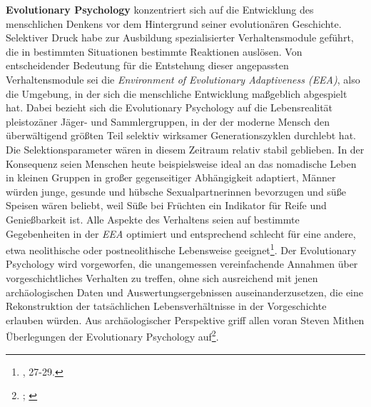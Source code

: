 \documentclass[openany,twoside,twocolumn]{book}
\let\rmarkdownfootnote\footnote%
\def\footnote{\protect\rmarkdownfootnote}
\begin{document}
\textbf{Evolutionary Psychology} konzentriert sich auf die Entwicklung
des menschlichen Denkens vor dem Hintergrund seiner evolutionären
Geschichte. Selektiver Druck habe zur Ausbildung spezialisierter
Verhaltensmodule geführt, die in bestimmten Situationen bestimmte
Reaktionen auslösen. Von entscheidender Bedeutung für die Entstehung
dieser angepassten Verhaltensmodule sei die \emph{Environment of
Evolutionary Adaptiveness (EEA)}, also die Umgebung, in der sich die
menschliche Entwicklung maßgeblich abgespielt hat. Dabei bezieht sich
die Evolutionary Psychology auf die Lebensrealität pleistozäner Jäger-
und Sammlergruppen, in der der moderne Mensch den überwältigend größten
Teil selektiv wirksamer Generationszyklen durchlebt hat. Die
Selektionsparameter wären in diesem Zeitraum relativ stabil geblieben.
In der Konsequenz seien Menschen heute beispielsweise ideal an das
nomadische Leben in kleinen Gruppen in großer gegenseitiger Abhängigkeit
adaptiert, Männer würden junge, gesunde und hübsche Sexualpartnerinnen
bevorzugen und süße Speisen wären beliebt, weil Süße bei Früchten ein
Indikator für Reife und Genießbarkeit ist. Alle Aspekte des Verhaltens
seien auf bestimmte Gegebenheiten in der \emph{EEA} optimiert und
entsprechend schlecht für eine andere, etwa neolithische oder
postneolithische Lebensweise geeignet\footnote{\textcite{SmithThreestylesevolutionary2000},
  27-29.}. Der Evolutionary Psychology wird vorgeworfen, die
unangemessen vereinfachende Annahmen über vorgeschichtliches Verhalten
zu treffen, ohne sich ausreichend mit jenen archäologischen Daten und
Auswertungsergebnissen auseinanderzusetzen, die eine Rekonstruktion der
tatsächlichen Lebensverhältnisse in der Vorgeschichte erlauben würden.
Aus archäologischer Perspektive griff allen voran Steven Mithen
Überlegungen der Evolutionary Psychology auf\footnote{\textcite{Mithenprehistorymindsearch1996};
  \textcite{mithen_cognitive_1997}}.
\end{document}
